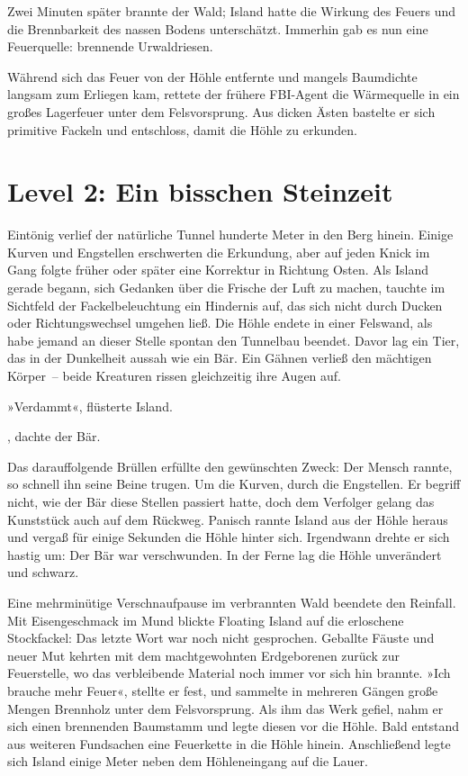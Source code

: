 Zwei Minuten später brannte der Wald; Island hatte die Wirkung des Feuers und die Brennbarkeit des nassen Bodens unterschätzt. Immerhin gab es nun eine Feuerquelle: brennende Urwaldriesen.

Während sich das Feuer von der Höhle entfernte und mangels Baumdichte langsam zum Erliegen kam, rettete der frühere FBI-Agent die Wärmequelle in ein großes Lagerfeuer unter dem Felsvorsprung. Aus dicken Ästen bastelte er sich primitive Fackeln und entschloss, damit die Höhle zu erkunden.

\section{Level 2: Ein bisschen Steinzeit}

Eintönig verlief der natürliche Tunnel hunderte Meter in den Berg hinein. Einige Kurven und Engstellen erschwerten die Erkundung, aber auf jeden Knick im Gang folgte früher oder später eine Korrektur in Richtung Osten. Als Island gerade begann, sich Gedanken über die Frische der Luft zu machen, tauchte im Sichtfeld der Fackelbeleuchtung ein Hindernis auf, das sich nicht durch Ducken oder Richtungswechsel umgehen ließ. Die Höhle endete in einer Felswand, als habe jemand an dieser Stelle spontan den Tunnelbau beendet. Davor lag ein Tier, das in der Dunkelheit aussah wie ein Bär. Ein Gähnen verließ den mächtigen Körper~– beide Kreaturen rissen gleichzeitig ihre Augen auf.

»Verdammt«, flüsterte Island.

, dachte der Bär. 

Das darauffolgende Brüllen erfüllte den gewünschten Zweck: Der Mensch rannte, so schnell ihn seine Beine trugen. Um die Kurven, durch die Engstellen. Er begriff nicht, wie der Bär diese Stellen passiert hatte, doch dem Verfolger gelang das Kunststück auch auf dem Rückweg. Panisch rannte Island aus der Höhle heraus und vergaß für einige Sekunden die Höhle hinter sich. Irgendwann drehte er sich hastig um: Der Bär war verschwunden. In der Ferne lag die Höhle unverändert und schwarz.

Eine mehrminütige Verschnaufpause im verbrannten Wald beendete den Reinfall. Mit Eisengeschmack im Mund blickte Floating Island auf die erloschene Stockfackel: Das letzte Wort war noch nicht gesprochen. Geballte Fäuste und neuer Mut kehrten mit dem machtgewohnten Erdgeborenen zurück zur Feuerstelle, wo das verbleibende Material noch immer vor sich hin brannte. »Ich brauche mehr Feuer«, stellte er fest, und sammelte in mehreren Gängen große Mengen Brennholz unter dem Felsvorsprung. Als ihm das Werk gefiel, nahm er sich einen brennenden Baumstamm und legte diesen vor die Höhle. Bald entstand aus weiteren Fundsachen eine Feuerkette in die Höhle hinein. Anschließend legte sich Island einige Meter neben dem Höhleneingang auf die Lauer.

